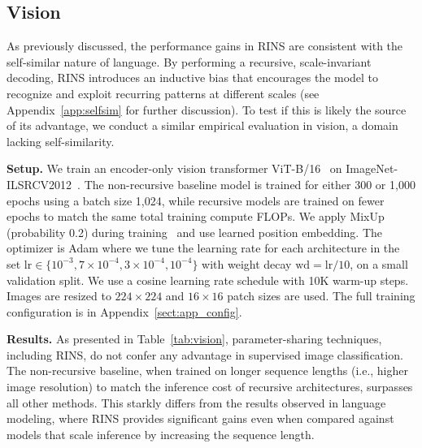 \subsection{Vision}\label{sect:vision}
As previously discussed, the performance gains in RINS are consistent with the self-similar nature of language. By performing a recursive, scale-invariant decoding, RINS introduces an inductive bias that encourages the model to recognize and exploit recurring patterns at different scales (see Appendix~\ref{app:selfsim} for further discussion). To test if this is likely the source of its advantage, we conduct a similar empirical evaluation in vision, a domain lacking self-similarity.

\textbf{Setup.} We train an encoder-only vision transformer ViT-B/16~\cite{dosovitskiy2021imageworth16x16words} on ImageNet-ILSRCV2012~\cite{deng2009imagenet}. The non-recursive baseline model is trained for either 300 or 1,000 epochs using a batch size 1,024, while recursive models are trained on fewer epochs to match the same total training compute FLOPs. We apply MixUp (probability 0.2) during training~\cite{zhang2018mixupempiricalriskminimization} and use learned position embedding. The optimizer is Adam where we tune the learning rate for each architecture in the set $\mathrm{lr}\in\{10^{-3}, 7\times10^{-4}, 3\times10^{-4}, 10^{-4}\}$ with weight decay $\mathrm{wd}=\mathrm{lr}/10$, on a small validation split. We use a cosine learning rate schedule with 10K warm-up steps. Images are resized to $224\times224$ and $16\times16$ patch sizes are used. The full training configuration is in Appendix~\ref{sect:app_config}.

\textbf{Results.} As presented in Table~\ref{tab:vision}, parameter-sharing techniques, including RINS, do not confer any advantage in supervised image classification. The non-recursive baseline, when trained on longer sequence lengths (i.e., higher image resolution) to match the inference cost of recursive architectures, surpasses all other methods. This starkly differs from the results observed in language modeling, where RINS provides significant gains even when compared against models that scale inference by increasing the sequence length.  

